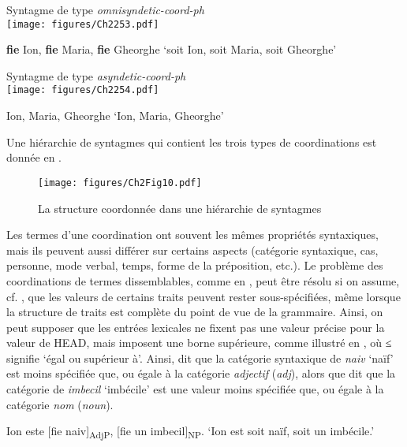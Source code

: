\ea \label{ch2:ex253}
\ea Syntagme de type \textit{omnisyndetic-coord-ph}\\
\texttt{[image: figures/Ch2253.pdf]}


\ex \textbf{fie} Ion, \textbf{fie} Maria, \textbf{fie} Gheorghe
\glt ‘soit Ion, soit Maria, soit Gheorghe’
\z
\z


\ea \label{ch2:ex254}

\ea Syntagme de type \textit{asyndetic-coord-ph}\\
\texttt{[image: figures/Ch2254.pdf]}

\ex Ion, Maria, Gheorghe
\glt ‘Ion, Maria, Gheorghe’
\z
\z

Une hiérarchie de syntagmes qui contient les trois types de coordinations est donnée en . 

\begin{figure} 

   \texttt{[image: figures/Ch2Fig10.pdf]}

\caption{La structure coordonnée dans une hiérarchie de syntagmes}
\label{ch2:fig10}
\end{figure}

Les termes d’une coordination ont souvent les mêmes propriétés syntaxiques, mais ils peuvent aussi différer sur certains aspects (catégorie syntaxique, cas, personne, mode verbal, temps, forme de la préposition, etc.). Le problème des coordinations de termes dissemblables, comme en , peut être résolu si on assume, cf. \citet{Sag2003,Sag2005}, que les valeurs de certains traits peuvent rester sous-spécifiées, même lorsque la structure de traits est complète du point de vue de la grammaire. Ainsi, on peut supposer que les entrées lexicales ne fixent pas une valeur précise pour la valeur de HEAD, mais imposent une borne supérieure, comme illustré en , où ≤ signifie ‘égal ou supérieur à’. Ainsi,  dit que la catégorie syntaxique de \textit{naiv} ‘naïf’ est moins spécifiée que, ou égale à la catégorie \textit{adjectif} (\textit{adj}), alors que  dit que la catégorie de \textit{imbecil} ‘imbécile’ est une valeur moins spécifiée que, ou égale à la catégorie \textit{nom} (\textit{noun}). 

\ea \label{ch2:ex255}
\ea Ion este [fie naiv]\textsubscript{AdjP}, [fie un imbecil]\textsubscript{NP}. \label{ch2:ex255a}
\glt ‘Ion est soit naïf, soit un imbécile.’

